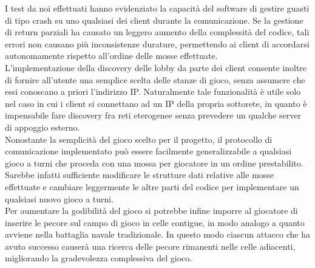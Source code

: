I test da noi effettuati hanno evidenziato la capacità del software di gestire 
guasti di tipo crash su uno qualsiasi dei client durante la comunicazione. Se 
la gestione di return parziali ha causato un leggero aumento della complessità 
del codice, tali errori non causano più inconsistenze durature, permettendo ai 
client di accordarsi autonomamente rispetto all'ordine delle mosse effettuate.
\\
L'implementazione della discovery delle lobby da parte dei client consente 
inoltre di fornire all'utente una semplice scelta delle stanze di gioco, senza 
assumere che essi conoscano a priori l'indirizzo IP. Naturalmente 
tale funzionalità è utile solo nel caso in cui i client si connettano ad un IP 
della propria sottorete, in quanto è impensabile fare discovery fra reti 
eterogenee senza prevedere un qualche server di appoggio esterno.
\\
Nonostante la semplicità del gioco scelto per il progetto, il protocollo di 
comunicazione implementato può essere facilmente generalizzabile a qualsiasi 
gioco a turni che proceda con una mossa per giocatore in un ordine prestabilito.
Sarebbe infatti sufficiente modificare le strutture dati relative alle mosse 
effettuate e cambiare leggermente le altre parti del codice per implementare un 
qualsiasi nuovo gioco a turni.
\\
Per aumentare la godibilità del gioco si potrebbe infine imporre al giocatore 
di inserire le pecore sul campo di gioco in celle contigue, in modo analogo a 
quanto avviene nella battaglia navale tradizionale. In questo modo ciascun 
attacco che ha avuto successo causerà una ricerca delle pecore rimanenti nelle celle adiacenti,
migliorando la gradevolezza complessiva del gioco.